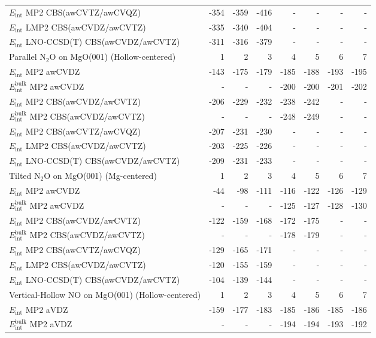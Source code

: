 \begin{longtable}{lrrrrrrr}
$E_\text{int}$ MP2 CBS(awCVTZ/awCVQZ) & -354 & -359 & -416 & - & - & - & - \\
$E_\text{int}$ LMP2 CBS(awCVDZ/awCVTZ) & -335 & -340 & -404 & - & - & - & - \\
$E_\text{int}$ LNO-CCSD(T) CBS(awCVDZ/awCVTZ) & -311 & -316 & -379 & - & - & - & - \\
\toprule
Parallel N$_2$O on MgO(001) (Hollow-centered) & 1 & 2 & 3 & 4 & 5 & 6 & 7 \\ 
\midrule
$E_\text{int}$ MP2 awCVDZ & -143 & -175 & -179 & -185 & -188 & -193 & -195 \\
$E_\text{int}^\text{bulk}$ MP2 awCVDZ & - & - & - & -200 & -200 & -201 & -202 \\
$E_\text{int}$ MP2 CBS(awCVDZ/awCVTZ) & -206 & -229 & -232 & -238 & -242 & - & - \\
$E_\text{int}^\text{bulk}$ MP2 CBS(awCVDZ/awCVTZ) & - & - & - & -248 & -249 & - & - \\
$E_\text{int}$ MP2 CBS(awCVTZ/awCVQZ) & -207 & -231 & -230 & - & - & - & - \\
$E_\text{int}$ LMP2 CBS(awCVDZ/awCVTZ) & -203 & -225 & -226 & - & - & - & - \\
$E_\text{int}$ LNO-CCSD(T) CBS(awCVDZ/awCVTZ) & -209 & -231 & -233 & - & - & - & - \\
\toprule
Tilted N$_2$O on MgO(001) (Mg-centered) & 1 & 2 & 3 & 4 & 5 & 6 & 7 \\ 
\midrule
$E_\text{int}$ MP2 awCVDZ & -44 & -98 & -111 & -116 & -122 & -126 & -129 \\
$E_\text{int}^\text{bulk}$ MP2 awCVDZ & - & - & - & -125 & -127 & -128 & -130 \\
$E_\text{int}$ MP2 CBS(awCVDZ/awCVTZ) & -122 & -159 & -168 & -172 & -175 & - & - \\
$E_\text{int}^\text{bulk}$ MP2 CBS(awCVDZ/awCVTZ) & - & - & - & -178 & -179 & - & - \\
$E_\text{int}$ MP2 CBS(awCVTZ/awCVQZ) & -129 & -165 & -171 & - & - & - & - \\
$E_\text{int}$ LMP2 CBS(awCVDZ/awCVTZ) & -120 & -155 & -159 & - & - & - & - \\
$E_\text{int}$ LNO-CCSD(T) CBS(awCVDZ/awCVTZ) & -104 & -139 & -144 & - & - & - & - \\
\toprule
Vertical-Hollow NO on MgO(001) (Hollow-centered) & 1 & 2 & 3 & 4 & 5 & 6 & 7 \\ 
\midrule
$E_\text{int}$ MP2 aVDZ & -159 & -177 & -183 & -185 & -186 & -185 & -186 \\
$E_\text{int}^\text{bulk}$ MP2 aVDZ & - & - & - & -194 & -194 & -193 & -192 \\

\end{longtable}
